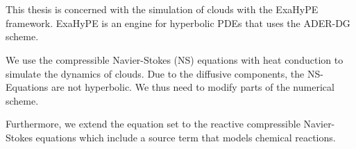 \chapter{\abstractname}
This thesis is concerned with the simulation of clouds with the ExaHyPE framework.
ExaHyPE is an engine for hyperbolic PDEs that uses the ADER-DG scheme.

We use the compressible Navier-Stokes (NS) equations with heat conduction to simulate the dynamics of clouds.
Due to the diffusive components, the NS-Equations are not hyperbolic.
We thus need to modify parts of the numerical scheme.

Furthermore, we extend the equation set to the reactive compressible Navier-Stokes equations which include a source term that models chemical reactions.


